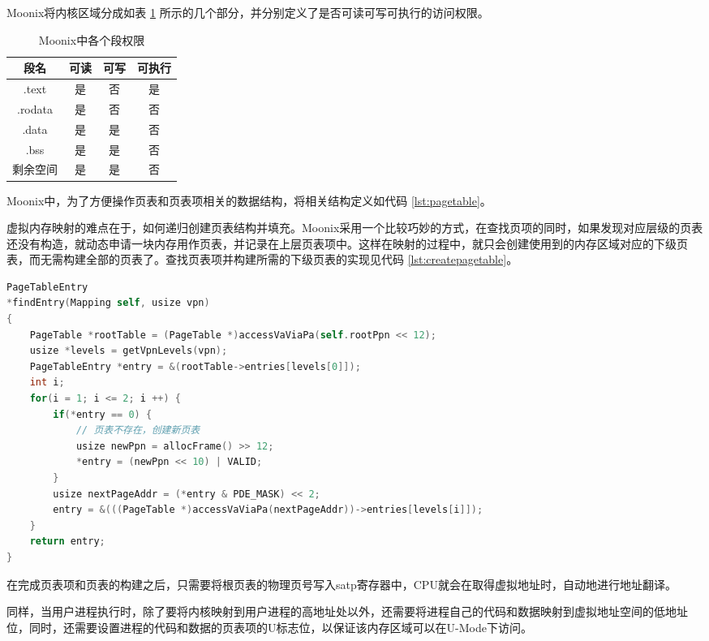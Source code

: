 Moonix将内核区域分成如表 \ref{tab:sectionprivilege} 所示的几个部分，并分别定义了是否可读可写可执行的访问权限。

\begin{table}[h]
	\centering
	\caption{Moonix中各个段权限}
	\label{tab:sectionprivilege}
	\begin{tabular}{|c|c|c|c|}
		\hline
		段名      & 可读 & 可写 & 可执行 \\ \hline
		.text   & 是  & 否  & 是   \\ \hline
		.rodata & 是  & 否  & 否   \\ \hline
		.data   & 是  & 是  & 否   \\ \hline
		.bss    & 是  & 是  & 否   \\ \hline
		剩余空间    & 是  & 是  & 否   \\ \hline
	\end{tabular}
\end{table}

Moonix中，为了方便操作页表和页表项相关的数据结构，将相关结构定义如代码 \ref{lst:pagetable}。

虚拟内存映射的难点在于，如何递归创建页表结构并填充。Moonix采用一个比较巧妙的方式，在查找页项的同时，如果发现对应层级的页表还没有构造，就动态申请一块内存用作页表，并记录在上层页表项中。这样在映射的过程中，就只会创建使用到的内存区域对应的下级页表，而无需构建全部的页表了。查找页表项并构建所需的下级页表的实现见代码 \ref{lst:createpagetable}。

\begin{lstlisting}[language={C}, caption={查找页表项}, label={lst:createpagetable}]
PageTableEntry
*findEntry(Mapping self, usize vpn)
{
	PageTable *rootTable = (PageTable *)accessVaViaPa(self.rootPpn << 12);
	usize *levels = getVpnLevels(vpn);
	PageTableEntry *entry = &(rootTable->entries[levels[0]]);
	int i;
	for(i = 1; i <= 2; i ++) {
		if(*entry == 0) {
			// 页表不存在，创建新页表
			usize newPpn = allocFrame() >> 12;
			*entry = (newPpn << 10) | VALID;
		}
		usize nextPageAddr = (*entry & PDE_MASK) << 2;
		entry = &(((PageTable *)accessVaViaPa(nextPageAddr))->entries[levels[i]]);
	}
	return entry;
}
\end{lstlisting}

在完成页表项和页表的构建之后，只需要将根页表的物理页号写入satp寄存器中，CPU就会在取得虚拟地址时，自动地进行地址翻译。

同样，当用户进程执行时，除了要将内核映射到用户进程的高地址处以外，还需要将进程自己的代码和数据映射到虚拟地址空间的低地址位，同时，还需要设置进程的代码和数据的页表项的U标志位，以保证该内存区域可以在U-Mode下访问。